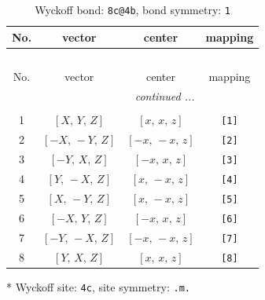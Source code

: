 \documentclass[fleqn,8pt]{jsarticle}
\begin{document}
\renewcommand{\arraystretch}{1.2}
\begin{longtable}{cccc}
\caption{Wyckoff bond: {\tt 8c@4b}, bond symmetry: {\tt 1}}
 \\
 \hline \hline
No. & vector & center & mapping \\ \hline \endfirsthead

\multicolumn{3}{l}{\tablename\ \thetable{}} \\
 \hline \hline
No. & vector & center & mapping \\ \hline \endhead

 \hline \hline
\multicolumn{3}{r}{\footnotesize\it continued ...} \\ \endfoot

 \hline \hline
\multicolumn{3}{r}{} \\ \endlastfoot

1 & $\left[ X,\, Y,\, Z \right]$ & $\left[ x,\, x,\, z \right]$ & {\tt [1]} \\ \hline
2 & $\left[ - X,\, - Y,\, Z \right]$ & $\left[ - x,\, - x,\, z \right]$ & {\tt [2]} \\ \hline
3 & $\left[ - Y,\, X,\, Z \right]$ & $\left[ - x,\, x,\, z \right]$ & {\tt [3]} \\ \hline
4 & $\left[ Y,\, - X,\, Z \right]$ & $\left[ x,\, - x,\, z \right]$ & {\tt [4]} \\ \hline
5 & $\left[ X,\, - Y,\, Z \right]$ & $\left[ x,\, - x,\, z \right]$ & {\tt [5]} \\ \hline
6 & $\left[ - X,\, Y,\, Z \right]$ & $\left[ - x,\, x,\, z \right]$ & {\tt [6]} \\ \hline
7 & $\left[ - Y,\, - X,\, Z \right]$ & $\left[ - x,\, - x,\, z \right]$ & {\tt [7]} \\ \hline
8 & $\left[ Y,\, X,\, Z \right]$ & $\left[ x,\, x,\, z \right]$ & {\tt [8]} \\
\end{longtable}
* Wyckoff site: {\tt 4c}, site symmetry: {\tt .m.}
\renewcommand{\arraystretch}{1.2}
\end{document}
